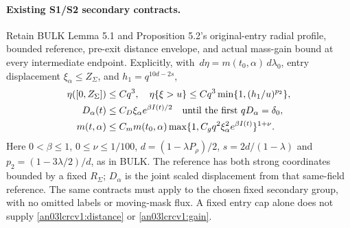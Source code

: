 \documentclass[11pt]{article}
\theoremstyle{remark}\newtheorem{remark}[theorem]{Remark}
\newcommand{\dd}{\,d}
\begin{document}
\paragraph{Existing S1/S2 secondary contracts.}
Retain BULK Lemma 5.1 and Proposition 5.2's original-entry radial
profile, bounded reference, pre-exit distance envelope, and actual
mass-gain bound at every intermediate endpoint. Explicitly, with
$\dd\eta=m(t_0,\alpha)\dd\lambda_0$, entry displacement
$\xi_\alpha\le Z_\Sigma$, and $h_1=q^{10d-2s}$,
\begin{align}
 \eta([0,Z_\Sigma])&\le Cq^3,\quad
 \eta\{\xi>u\}\le Cq^3\min\{1,(h_1/u)^{p_2}\},
 \label{an03lcrcv1:profile}\\
 D_\alpha(t)&\le C_D\xi_\alpha e^{\beta I(t)/2}
 \quad\hbox{until the first }qD_\alpha=\delta_0,
 \label{an03lcrcv1:distance}\\
 m(t,\alpha)&\le C_m m(t_0,\alpha)
 \max\{1,C_gq^2\xi_\alpha^2e^{\beta I(t)}\}^{1+\nu}.
 \label{an03lcrcv1:gain}
\end{align}
Here $0<\beta\le1$, $0\le\nu\le1/100$,
$d=(1-\lambda P_\rho)/2$, $s=2d/(1-\lambda)$ and
$p_2=(1-3\lambda/2)/d$, as in BULK. The reference has both strong
coordinates bounded by a fixed $R_\Sigma$; $D_\alpha$ is the joint
scaled displacement from that same-field reference.
The same contracts must apply to the chosen fixed secondary group,
with no omitted labels or moving-mask flux. A fixed entry cap alone
does not supply \eqref{an03lcrcv1:distance} or \eqref{an03lcrcv1:gain}.
\end{document}
